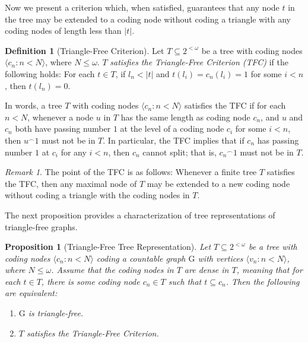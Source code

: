\documentclass{amsart}
\newtheorem{prop}[thm]{Proposition}
\theoremstyle{remark}
\newtheorem{rem}[thm]{Remark}
\theoremstyle{definition}
\newtheorem{defn}[thm]{Definition}
\theoremstyle{remark}
\newcommand{\om}{\omega}
\newcommand{\sse}{\subseteq}
\newcommand{\G}{\mathrm{G}}
\newcommand{\lgl}{\langle}
\newcommand{\rgl}{\rangle}
\begin{document}
Now we present a criterion which, when satisfied, guarantees that any node $t$  in the tree may be extended to a coding node without coding a triangle with any coding nodes of length less than $|t|$.


\begin{defn}[Triangle-Free   Criterion]\label{defn.trianglefreeextcrit}
Let $T\sse 2^{<\om}$ be a  tree with coding nodes $\lgl c_n:n<N\rgl$,
where  $N\le\om$.
$T$
{\em satisfies the Triangle-Free Criterion (TFC)}
if the following holds:
For each $t\in T$,
if  $l_n<|t|$ and
 $t(l_i)=c_n(l_i)=1$  for  some $i<n$,
then $t(l_n)=0$.
\end{defn}




In words, a tree  $T$ with coding  nodes $\lgl c_n:n<N\rgl$ satisfies the  TFC  if  for each $n<N$,  whenever a node $u$  in $T$ has the same length as coding node $c_n$,  and $u$ and $c_n$ both have passing number $1$ at the level of  a coding node $c_i$ for some $i<n$,
then $u^{\frown}1$ must not be in $T$.
In particular, the TFC implies  that if $c_n$ has passing number $1$ at $c_i$ for any $i<n$,
then $c_n$ cannot split; that is, ${c_n}^{\frown}1$ must not be in $T$.

\begin{rem}
The point of the TFC is as follows:
  Whenever  a finite tree  $T$ satisfies the TFC, then any maximal node of $T$ may be extended to a new  coding node without coding a triangle with the coding nodes in $T$.
\end{rem}


The next proposition provides a characterization of tree representations of triangle-free graphs.


\begin{prop}[Triangle-Free  Tree Representation]\label{prop.trianglefreerep}
Let $T\sse 2^{<\om}$ be a tree
with coding nodes $\lgl c_n:n<N\rgl$
 coding  a countable   graph $\G$  with  vertices $\lgl v_n:n<N\rgl$, where $N\le\om$.
Assume  that  the coding nodes in $T$ are dense in $T$, meaning that
for each $t\in T$, there is some coding node $c_n\in T$ such that $t\sse c_n$.
Then the  following are equivalent:
\begin{enumerate}
\item
 $\G$ is triangle-free.
\item
$T$ satisfies the Triangle-Free Criterion.
\end{enumerate}
\end{prop}
\end{document}
